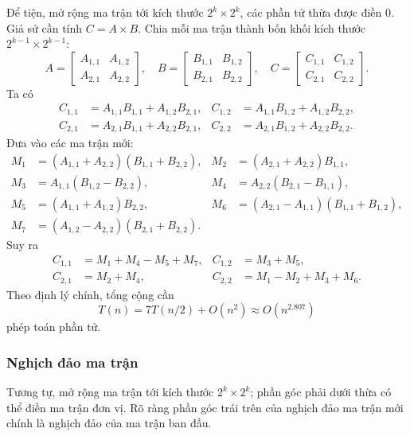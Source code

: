 \documentclass[11pt]{article}
\begin{document}
Để tiện, mở rộng ma trận tới kích thước \(2^k\times 2^k\), các phần tử thừa
được điền \(0\). Giả sử cần tính \(C=A\times B\). Chia mỗi ma trận thành bốn
khối kích thước \(2^{k-1}\times 2^{k-1}\):
\[
  A=\begin{bmatrix}A_{1,1}&A_{1,2}\\A_{2,1}&A_{2,2}\end{bmatrix},\quad
  B=\begin{bmatrix}B_{1,1}&B_{1,2}\\B_{2,1}&B_{2,2}\end{bmatrix},\quad
  C=\begin{bmatrix}C_{1,1}&C_{1,2}\\C_{2,1}&C_{2,2}\end{bmatrix}.
\]
Ta có
\[
\begin{aligned}
  C_{1,1}&=A_{1,1}B_{1,1}+A_{1,2}B_{2,1},&
  C_{1,2}&=A_{1,1}B_{1,2}+A_{1,2}B_{2,2},\\
  C_{2,1}&=A_{2,1}B_{1,1}+A_{2,2}B_{2,1},&
  C_{2,2}&=A_{2,1}B_{1,2}+A_{2,2}B_{2,2}.
\end{aligned}
\]
Đưa vào các ma trận mới:
\[
\begin{aligned}
  M_1&=(A_{1,1}+A_{2,2})(B_{1,1}+B_{2,2}),&
  M_2&=(A_{2,1}+A_{2,2})B_{1,1},\\
  M_3&=A_{1,1}(B_{1,2}-B_{2,2}),&
  M_4&=A_{2,2}(B_{2,1}-B_{1,1}),\\
  M_5&=(A_{1,1}+A_{1,2})B_{2,2},&
  M_6&=(A_{2,1}-A_{1,1})(B_{1,1}+B_{1,2}),\\
  M_7&=(A_{1,2}-A_{2,2})(B_{2,1}+B_{2,2}).
\end{aligned}
\]
Suy ra
\[
\begin{aligned}
  C_{1,1}&=M_1+M_4-M_5+M_7,&
  C_{1,2}&=M_3+M_5,\\
  C_{2,1}&=M_2+M_4,&
  C_{2,2}&=M_1-M_2+M_3+M_6.
\end{aligned}
\]
Theo định lý chính, tổng cộng cần
\[
  T(n)=7T(n/2)+O(n^2)\approx O(n^{2.807})
\]
phép toán phần tử.

\subsubsection{Nghịch đảo ma trận}

Tương tự, mở rộng ma trận tới kích thước \(2^k\times 2^k\); phần góc phải dưới
thừa có thể điền ma trận đơn vị. Rõ ràng phần góc trái trên của nghịch đảo ma
trận mới chính là nghịch đảo của ma trận ban đầu.
\end{document}
